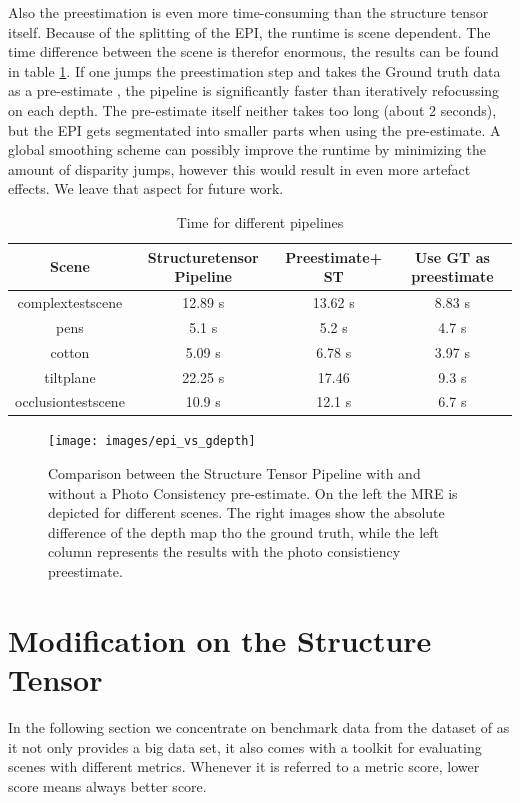 \documentclass  [
  paper    = a4,
  BCOR     = 10mm,
  twoside,
  fontsize = 12pt,
  fleqn,
  toc      = bibnumbered,
  toc      = listofnumbered,
  numbers  = noendperiod,
  headings = normal,
  listof   = leveldown,
  version  = 3.03
]                                       {scrreprt}
\begin{document}
 	Also the preestimation is even more time-consuming than the structure tensor itself. Because of the splitting of the EPI, the runtime is scene dependent. The time difference between the scene is therefor enormous, the results can be found in table \ref{tab:time_gdepth}. If one jumps the preestimation step and takes the Ground truth data as a \glqq pre-estimate \grqq, the pipeline is significantly faster than iteratively refocussing on each depth. The pre-estimate itself neither takes too long (about 2 seconds), but the EPI gets segmentated into smaller parts when using the pre-estimate. A global smoothing scheme can possibly improve the runtime by minimizing the amount of disparity jumps, however this would result in even more artefact effects. We leave that aspect for future work.\\
 	\begin{table}
	\begin{tabular}{|c|c|c|c|}
		\hline 
		Scene & Structuretensor Pipeline & Preestimate+ ST & Use GT as preestimate \\ 
		\hline 
		complextestscene & 12.89 s & 13.62 s & 8.83 s \\ 
		\hline 
		pens & 5.1 s & 5.2 s & 4.7 s \\ 
		\hline 
		cotton & 5.09 s & 6.78 s & 3.97 s \\ 
		\hline 
		tiltplane & 22.25 s & 17.46 &  9.3 s \\ 
		\hline 
		occlusiontestscene & 10.9 s & 12.1 s & 6.7 s \\ 
		\hline 
		
	\end{tabular} 
\label{tab:time_gdepth}
\caption[Time]{Time for different pipelines}
 	\end{table}

 	
 	
 	
 	\begin{figure}
 		\centering
 		\texttt{[image: images/epi\_vs\_gdepth]}
 		\caption[Photoconsistency Preestimate for the structure tensor]{Comparison between the Structure Tensor Pipeline with and without a Photo Consistency pre-estimate. On the left the MRE is depicted for different scenes. The right images show the absolute difference of the depth map tho the ground truth, while the left column represents the results with the photo consistiency preestimate.}
 		\label{fig:epivsgdepth}
 	\end{figure}
 	
	 

\section{Modification on the Structure Tensor}
In the following section we concentrate on benchmark data from the dataset of \cite{honauer2016benchmark} as it not only provides a big data set, it also comes with a toolkit for evaluating scenes with different metrics. Whenever it is referred to a metric score, lower score means always better score.
\end{document}
